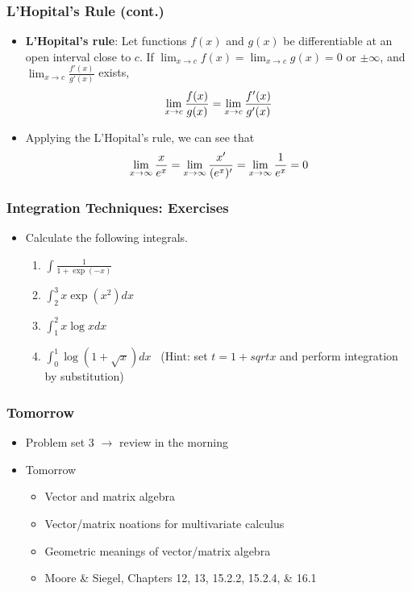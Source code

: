 \documentclass[pdflatex, 12pt]{beamer}
\begin{document}
\begin{frame}
\frametitle{L'Hopital's Rule (cont.)}
\begin{itemize}
\item \textbf{L'Hopital's rule}: Let functions $f(x)$ and $g(x)$ be differentiable at an open interval close to $c$. If $\lim_{x \to c} f(x) = \lim_{x \to c} g(x) = 0$ or $\pm\infty$, and $\lim_{x \to c} \frac{f'(x)}{g'(x)}$ exists,
 \begin{equation}
 \lim_{x \to c} \frac{f(x)}{g(x)} = \lim_{x \to c} \frac{f'(x)}{g'(x)} \notag 
 \end{equation} 
\vspace{0.1cm}
\item Applying the L'Hopital's rule, we can see that
 \begin{equation}
 \lim_{x \to \infty} \frac{x}{e^x} = \lim_{x \to \infty} \frac{x'}{(e^x)'} = \lim_{x \to \infty} \frac{1}{e^x} = 0 \notag 
 \end{equation} 
\end{itemize}
\end{frame}

\begin{frame}
\frametitle{Integration Techniques: Exercises}
\begin{itemize}
\item Calculate the following integrals.
 \begin{enumerate}
 \item $\int \frac{1}{1 + \exp(-x)}$
 \vspace{0.1cm}
 \item $\int^3_2 x\exp(x^2)dx$
 \item $\int^2_1 x\log x dx$
 \item $\int^1_0 \log (1 + \sqrt{x})dx$ \ (Hint: set $t = 1 + sqrt{x}$ and perform integration by substitution)
 \end{enumerate}
\end{itemize}
\end{frame}

\begin{frame}
\frametitle{Tomorrow}
\begin{itemize}
\item Problem set 3 $\rightarrow$ review in the morning
\vspace{0.4cm}
\item Tomorrow
 \begin{itemize}
 \item Vector and matrix algebra
 \item Vector/matrix noations for multivariate calculus
 \item Geometric meanings of vector/matrix algebra
 \item Moore \& Siegel, Chapters 12, 13, 15.2.2, 15.2.4, \& 16.1
 \end{itemize}
\end{itemize}
\end{frame}
\end{document}
